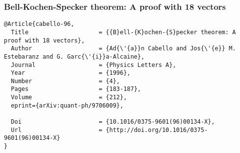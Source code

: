 \documentclass[%
  twocolumn,
 showpacs,
 showkeys,
 preprintnumbers,
 amsmath,amssymb,
 aps,
  pra,
  longbibliography,
 floatfix,
 ]{revtex4-1}
\begin{document}
\begin{figure*}
\end{figure*}

\clearpage
\newpage

\subsubsection{{B}ell-{K}ochen-{S}pecker theorem: A proof with 18 vectors}
\begin{verbatim}
@Article{cabello-96,
  Title                    = {{B}ell-{K}ochen-{S}pecker theorem: A proof with 18 vectors},
  Author                   = {Ad{\'{a}}n Cabello and Jos{\'{e}} M. Estebaranz and G. Garc{\'{i}}a-Alcaine},
  Journal                  = {Physics Letters A},
  Year                     = {1996},
  Number                   = {4},
  Pages                    = {183-187},
  Volume                   = {212},
  eprint={arXiv:quant-ph/9706009},

  Doi                      = {10.1016/0375-9601(96)00134-X},
  Url                      = {http://doi.org/10.1016/0375-9601(96)00134-X}
}
\end{verbatim}
\end{document}
